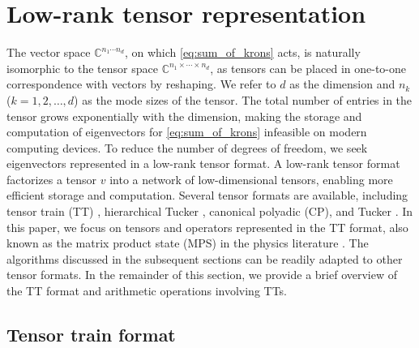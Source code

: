 \documentclass[10pt,preprint]{elsarticle}
\begin{document}
\section{Low-rank tensor representation}
\label{sec:tensors}

The vector space $\mathbb{C}^{n_1\cdots n_d}$, on which \eqref{eq:sum_of_krons} acts, is naturally isomorphic to the tensor space $\mathbb{C}^{n_1 \times \cdots \times n_d}$, as tensors can be placed in one-to-one correspondence with vectors by reshaping. We refer to $d$ as the dimension and $n_k$ ($k=1,2,\ldots,d$) as the mode sizes of the tensor. The total number of entries in the tensor grows exponentially with the dimension, making the storage and computation of eigenvectors for \eqref{eq:sum_of_krons} infeasible on modern computing devices. To reduce the number of degrees of freedom, we seek eigenvectors represented in a low-rank tensor format. A low-rank tensor format factorizes a tensor $v$ into a network of low-dimensional tensors, enabling more efficient storage and computation. Several tensor formats are available, including tensor train (TT) \cite{oseledets2011tensor}, hierarchical Tucker \cite{grasedyck2010hierarchical}, canonical polyadic (CP), and Tucker \cite{kolda2009tensor}. In this paper, we focus on tensors and operators represented in the TT format, also known as the matrix product state (MPS) in the physics literature \cite{Orus2014}. The algorithms discussed in the subsequent sections can be readily adapted to other tensor formats. 
%
In the remainder of this section, we provide a brief overview of the TT format and arithmetic operations involving TTs. 


\subsection{Tensor train format}
\label{sec:TT_format}
\end{document}
